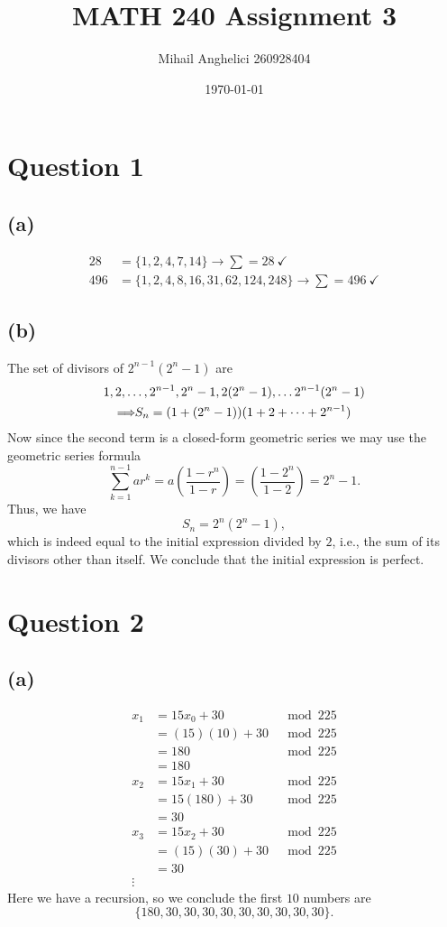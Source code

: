 \documentclass[12pt]{article}
\title{MATH 240 Assignment 3}
\author{Mihail Anghelici 260928404 }
\date{\today}
\let\oldimplies\implies
\renewcommand*{\implies}{
	\hspace{-0.05cm}\resizebox{.95\width}{\height}{$\oldimplies$}\hspace{-0.05cm}
}
\begin{document}
	\maketitle
	\section*{Question 1}
		\subsection*{(a)} 
			\begin{align*}
				28 &= \{1,2,4,7,14\} \xrightarrow{}\sum = 28 \ \checkmark\\
				496 &= \{ 1,2,4,8,16,31,62,124,248\} \xrightarrow{} \sum = 496 \ \checkmark  
			\end{align*}
		\subsection*{(b)}
			The set of divisors of $2^{n-1} (2^{n}-1)$ are 
			\begin{gather*}
				1,2,\dots,2^{n-1} , 2^{n}-1, 2(2^{n}-1) , \dots 2^{n-1}(2^{n} -1) \\
				\implies S_{n} =(1+(2^{n}-1))(1+2+\dots + 2^{n-1}) 
			\end{gather*}
			Now since the second term is a closed-form geometric series we may use the geometric series formula 
			$$ \sum_{k=1}^{n-1} ar^{k} = a \left(\frac{1-r^{n}}{1-r}\right) = \left(\frac{1-2^{n}}{1-2}\right) = 2^{n} -1.$$
			Thus, we have 
			$$ S_{n} = 2^{n}(2^{n} -1),$$
			which is indeed equal to the initial expression divided by $2$, i.e., the sum of its divisors other than itself. We conclude that the initial expression is perfect.
	\section*{Question 2}
		\subsection*{(a)}
			\begin{align*}
				x_{1} &= 15 x_{0} +30 &\mod 225 \\
				&= (15)(10) + 30 &\mod 225\\ 
				&= 180 &\mod 225\\ 
				&= 180 &\\
				x_{2} &= 15 x_{1} +30 &\mod 225 \\
				&= 15(180) +30 &\mod 225 \\
				&= 30 &\\
				x_{3} &= 15 x_{2} +30 &\mod 225 \\
				&= (15)(30) + 30 &\mod 225 \\
				&= 30 &\\
				\vdots 
			\end{align*}
			Here we have a recursion, so we conclude the first $10$ numbers are $$\{180,30,30,30,30,30,30,30,30,30\}.$$
\end{document}
